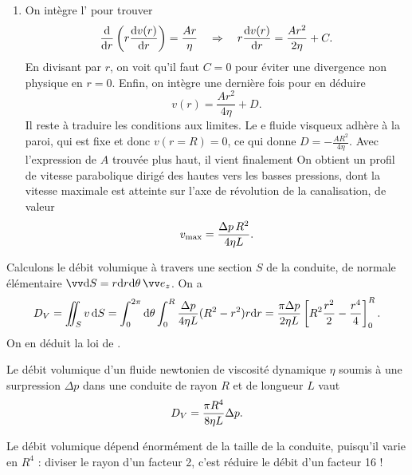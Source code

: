 \documentclass[12pt,fancy]{cours}
\begin{document}
\begin{enumerate}
\item
On intègre l’ pour trouver
\begin{equation}
\frac{\mathrm{d}}{\mathrm{d} r}\left(r\frac{\mathrm{d} v(r)}{\mathrm{d} r}\right)=\frac{Ar}{\eta} \quad\Rightarrow\quad r\frac{\mathrm{d} v(r)}{\mathrm{d} r}=\frac{Ar^2}{2\eta}+C.
\end{equation}
En divisant par $r$, on voit qu’il faut $C=0$ pour éviter une divergence non physique en $r=0$. Enfin, on intègre une dernière fois pour en déduire
\begin{equation}
v(r)=\frac{Ar^2}{4\eta}+D.
\end{equation}
Il reste à traduire les conditions aux limites. Le e fluide visqueux adhère à la paroi, qui est fixe et donc $v(r=R)=0$, ce qui donne $D=-\frac{AR^2}{4\eta}$. Avec l'expression de $A$ trouvée plus haut, il vient finalement
On obtient un profil de vitesse parabolique dirigé des hautes vers les basses pressions, dont la vitesse maximale est atteinte sur l'axe de révolution de la canalisation, de valeur
\begin{equation}
v_{\rm max} = \frac{\Delta p\, R^2}{4\eta L}.
\end{equation}
\end{enumerate}


 Calculons le débit volumique à travers une section $S$ de la conduite, de normale élémentaire $\Vec{\d S}=r\d r\d\theta\, \ez$. On a
\begin{equation}
D_V = \iint_S v \,\mathrm{d} S =\int_{0}^{2\pi}\mathrm{d}\theta\int_{0}^{R} \frac{\Delta p}{4\eta L}(R^2-r^2)r\mathrm{d} r=\frac{\pi \Delta p}{2\eta L}\left[R^2 \frac{r^2}{2}-\frac{r^4}{4}\right]^{R}_{0}.
\end{equation}
On en déduit la loi de .
\begin{theorem}\label{form:poiseuille}
Le débit volumique d'un fluide newtonien de viscosité dynamique $\eta$ soumis à une surpression $\Delta p$ dans une conduite de rayon $R$ et de longueur $L$ vaut
\begin{equation*}
	D_V=\frac{\pi R^4}{8\eta L}\Delta p.
\end{equation*}
\end{theorem}
Le débit volumique dépend énormément de la taille de la conduite, puisqu’il varie en $R^4$ : diviser le rayon d'un facteur 2, c'est réduire le débit d'un facteur 16 !
\end{document}
